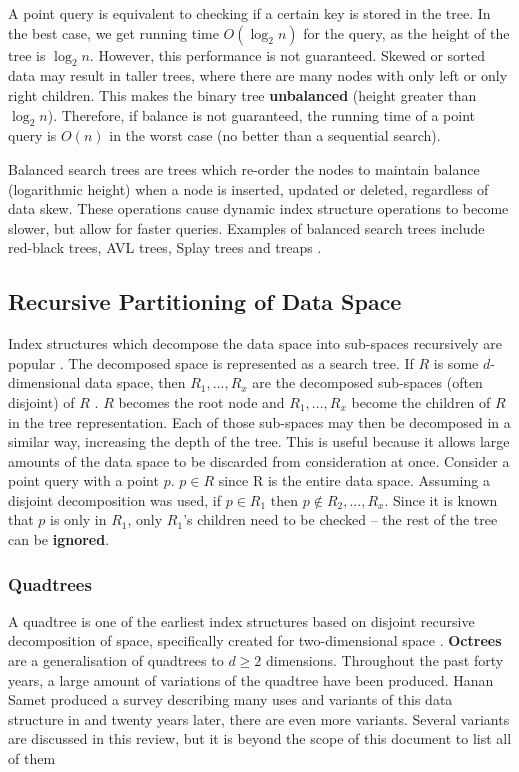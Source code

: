 A point query is equivalent to checking if a certain key is stored in the tree. In the best case, we get running time $O(\log_2 n)$ for the query, as the height of the tree is $\log_2 n$. However, this performance is not guaranteed. Skewed or sorted data may result in taller trees, where there are many nodes with only left or only right children. This makes the binary tree \textbf{unbalanced} (height greater than $\log_2 n$). Therefore, if balance is not guaranteed, the running time of a point query is $O(n)$ in the worst case (no better than a sequential search).

Balanced search trees are trees which re-order the nodes to maintain balance (logarithmic height) when a node is inserted, updated or deleted, regardless of data skew. These operations cause dynamic index structure operations to become slower, but allow for faster queries. Examples of balanced search trees include red-black trees, AVL trees, Splay trees and treaps \cite{introduction-to-algorithms}.

\subsection{Recursive Partitioning of Data Space}
\label{sec:recursive-partition-structures}

Index structures which decompose the data space into sub-spaces recursively are popular \cite{md-structures-samet}. The decomposed space is represented as a search tree. If $R$ is some $d$-dimensional data space, then $R_1,...,R_x$ are the decomposed sub-spaces (often disjoint) of $R$ . $R$ becomes the root node and $R_1,...,R_x$ become the children of $R$ in the tree representation. Each of those sub-spaces may then be decomposed in a similar way, increasing the depth of the tree. This is useful because it allows large amounts of the data space to be discarded from consideration at once. Consider a point query with a point $p$. $p \in R$ since R is the entire data space. Assuming a disjoint decomposition was used, if $p \in R_1$ then $p \not\in R_2,...,R_x$. Since it is known that $p$ is only in $R_1$, only $R_1$'s children need to be checked -- the rest of the tree can be \textbf{ignored}.

\subsubsection{Quadtrees}

A quadtree is one of the earliest index structures based on disjoint recursive decomposition of space, specifically created for two-dimensional space \cite{original-quadtree}. \textbf{Octrees} are a generalisation of quadtrees to $d \geq 2$ dimensions. Throughout the past forty years, a large amount of variations of the quadtree have been produced. Hanan Samet produced a survey describing many uses and variants of this data structure in  \cite{quadtree} and twenty years later, there are even more variants. Several variants are discussed in this review, but it is beyond the scope of this document to list all of them

